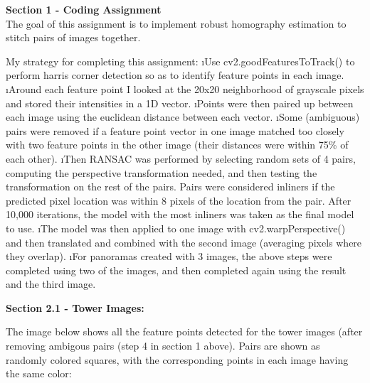 \documentclass[fleqn]{article}
\begin{document}

{\bf Section 1 - Coding Assignment} 
\\
The goal of this assignment is to implement robust homography estimation to stitch pairs of images together.

My strategy for completing this assignment:
\bee
\i Use cv2.goodFeaturesToTrack() to perform harris corner detection so as to identify feature points in each image.
\i Around each feature point I looked at the 20x20 neighborhood of grayscale pixels and stored their intensities in a 1D vector.
\i Points were then paired up between each image using the euclidean distance between each vector.
\i Some (ambiguous) pairs were removed if a feature point vector in one image matched too closely with two feature points in the other image (their distances were within 75\% of each other).
\i Then RANSAC was performed by selecting random sets of 4 pairs, computing the perspective transformation needed, and then testing the transformation on the rest of the pairs.  Pairs were considered inliners if the predicted pixel location was within 8 pixels of the location from the pair. After 10,000 iterations, the model with the most inliners was taken as the final model to use.
\i The model was then applied to one image with cv2.warpPerspective() and then translated and combined with the second image (averaging pixels where they overlap).
\i For panoramas created with 3 images, the above steps were completed using two of the images, and then completed again using the result and the third image.
\ene


{\bf Section 2.1 - Tower Images:} 

The image below shows all the feature points detected for the tower images (after removing ambigous pairs (step 4 in section 1 above).  Pairs are shown as randomly colored squares, with the corresponding points in each image having the same color:
\begin{center}
\end{center}
\end{document}
